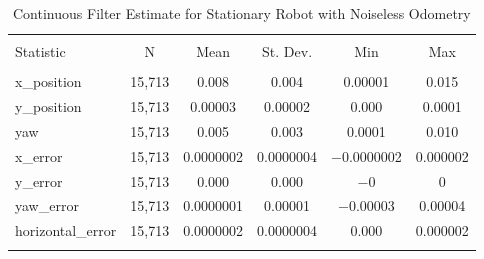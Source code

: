 
\begin{table}[h] \centering 
  \caption{Continuous Filter Estimate for Stationary Robot with Noiseless Odometry} 
  \label{tab:continuous_stationary_noiseless_summary} 
\begin{tabular}{@{\extracolsep{5pt}}lccccc} 
\\[-1.8ex]\hline 
\hline \\[-1.8ex] 
Statistic & \multicolumn{1}{c}{N} & \multicolumn{1}{c}{Mean} & \multicolumn{1}{c}{St. Dev.} & \multicolumn{1}{c}{Min} & \multicolumn{1}{c}{Max} \\ 
\hline \\[-1.8ex] 
x\_position & 15,713 & 0.008 & 0.004 & 0.00001 & 0.015 \\ 
y\_position & 15,713 & 0.00003 & 0.00002 & 0.000 & 0.0001 \\ 
yaw & 15,713 & 0.005 & 0.003 & 0.0001 & 0.010 \\ 
x\_error & 15,713 & 0.0000002 & 0.0000004 & $-$0.0000002 & 0.000002 \\ 
y\_error & 15,713 & 0.000 & 0.000 & $-$0 & 0 \\ 
yaw\_error & 15,713 & 0.0000001 & 0.00001 & $-$0.00003 & 0.00004 \\ 
horizontal\_error & 15,713 & 0.0000002 & 0.0000004 & 0.000 & 0.000002 \\ 
\hline \\[-1.8ex] 
\end{tabular} 
\end{table} 
